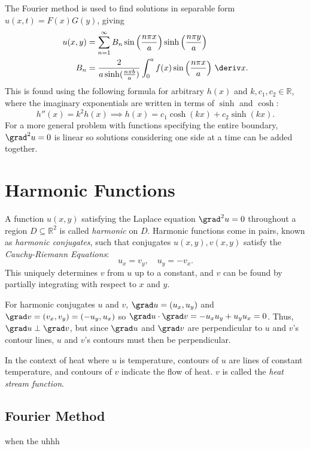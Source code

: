 \documentclass[10pt, a4paper]{article}
\begin{document}
\begin{landscape}
\begin{multicols*}{2}
    The Fourier method is used to find solutions in separable form \(u(x, t) = F(x) G(y)\), giving
    \begin{align*}
        u(x, y) &= \sum_{n=1}^{\infty} B_{n} \sin \left(\frac{n \pi x}{a}\right) \sinh \left(\frac{n \pi y}{a}\right) \\
        B_n &= \frac{2}{a \sinh(\frac{n \pi b}{a})} \int_{0}^{a} f(x) \sin \left(\frac{n \pi x}{a}\right) \,\deriv x.
    \end{align*}
    This is found using the following formula for arbitrary \(h(x)\) and \(k, c_1, c_2 \in \mathbb{R}\),
    where the imaginary exponentials are written in terms of \(\sinh\) and \(\cosh\):
    \[
        h''(x) = k^2 h(x) \implies h(x) = c_1 \cosh(kx) + c_2 \sinh(kx).
    \]
    For a more general problem with functions specifying the entire boundary, \(\grad^2 u = 0\) is linear
    so solutions considering one side at a time can be added together.
    
    \section{Harmonic Functions}

    A function \(u(x, y)\) satisfying the Laplace equation \(\grad^2 u = 0\) throughout a region
    \(D \subseteq \mathbb{R}^2\) is called \emph{harmonic} on \(D\). Harmonic functions come in
    pairs, known as \emph{harmonic conjugates}, such that conjugates \(u(x, y), v(x, y)\) satisfy the
    \emph{Cauchy-Riemann Equations}:
    \[
        u_x = v_y,
        \quad
        u_y = -v_x.
        \tag{on \(D\)}
    \]
    This uniquely determines \(v\) from \(u\) up to a constant, and \(v\) can be found by partially integrating
    with respect to \(x\) and \(y\).

    For harmonic conjugates \(u\) and \(v\), \(\grad u = (u_x, u_y)\) and \(\grad v = (v_x, v_y) = (-u_y, u_x)\) so
    \(\grad u \cdot \grad v = -u_x u_y + u_y u_x = 0\). Thus, \(\grad u \perp \grad v\), but since \(\grad u\) and
    \(\grad v\) are perpendicular to \(u\) and \(v\)'s contour lines, \(u\) and \(v\)'s contours must then be
    perpendicular. 

    In the context of heat where \(u\) is temperature, contours of \(u\) are lines of constant temperature, and 
    contours of \(v\) indicate the flow of heat. \(v\) is called the \emph{heat stream function}.

\end{multicols*}

\pagebreak

\begin{multicols*}{2}
    
    \section{Fourier Method}

    when the uhhh

\end{multicols*}

\end{landscape}
\end{document}
